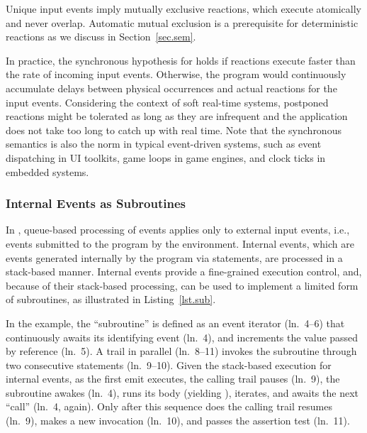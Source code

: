 Unique input events imply mutually exclusive reactions, which execute
atomically and never overlap.
%
Automatic mutual exclusion is a prerequisite for deterministic reactions as
we discuss in Section~\ref{sec.sem}.
%

In practice, the synchronous hypothesis for \CEU holds if reactions execute
faster than the rate of incoming input events.
%
Otherwise, the program would continuously accumulate delays between physical
occurrences and actual reactions for the input events.
%
Considering the context of soft real-time systems,
postponed reactions might be tolerated as long as they are infrequent and the
application does not take too long to catch up with real time.
%
Note that the synchronous semantics is also the norm in typical event-driven
systems, such as event dispatching in UI toolkits, game loops in game engines,
and clock ticks in embedded systems.

\subsubsection{Internal Events as Subroutines}

In \CEU, queue-based processing of events applies only to external input
events, i.e., events submitted to the program by the environment.
%
Internal events, which are events generated internally by the program via
 statements, are processed in a stack-based manner.
%
Internal events provide a fine-grained execution control, and, because of their
stack-based processing, can be used to implement a limited form of subroutines,
as illustrated in Listing~\ref{lst.sub}.

In the example, the ``subroutine''  is defined as an event iterator
(ln.~4--6) that continuously awaits its identifying event (ln.~4), and
increments the value passed by reference (ln.~5).
%
A trail in parallel (ln.~8--11) invokes the subroutine through two consecutive
 statements (ln.~9--10).
%
Given the stack-based execution for internal events, as the first emit
executes, the calling trail pauses (ln.~9), the subroutine awakes (ln.~4), runs
its body (yielding ), iterates, and awaits the next ``call'' (ln.~4,
again).
%
Only after this sequence does the calling trail resumes (ln.~9), makes a new
invocation (ln.~10), and passes the assertion test (ln.~11).

